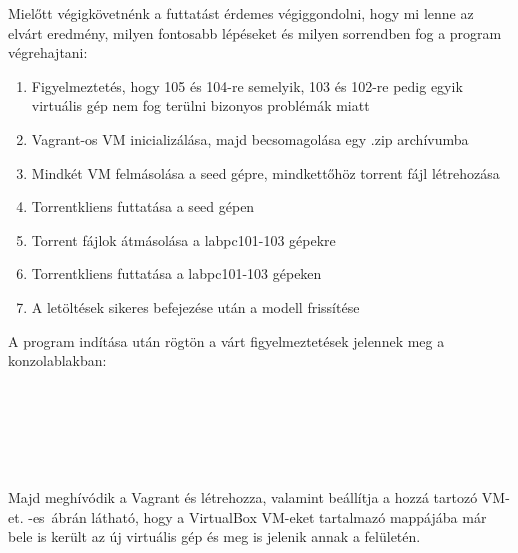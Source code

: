 Mielőtt végigkövetnénk a futtatást érdemes végiggondolni, hogy mi lenne az elvárt eredmény, milyen fontosabb lépéseket és milyen sorrendben fog a program végrehajtani:

\begin{enumerate}
  \item Figyelmeztetés, hogy 105 és 104-re semelyik, 103 és 102-re pedig egyik virtuális gép nem fog terülni bizonyos problémák miatt
  \item Vagrant-os VM inicializálása, majd becsomagolása egy .zip archívumba
  \item Mindkét VM felmásolása a seed gépre, mindkettőhöz torrent fájl létrehozása
  \item Torrentkliens futtatása a seed gépen
  \item Torrent fájlok átmásolása a labpc101-103 gépekre
  \item Torrentkliens futtatása a labpc101-103 gépeken
  \item A letöltések sikeres befejezése után a modell frissítése
\end{enumerate}

A program indítása után rögtön a várt figyelmeztetések jelennek meg a konzolablakban:\\\\
\\
\\
\\
\\\\
Majd meghívódik a Vagrant és létrehozza, valamint beállítja a hozzá tartozó VM-et. -es~ábrán látható, hogy a VirtualBox VM-eket tartalmazó mappájába már bele is került az új virtuális gép és meg is jelenik annak a felületén.

